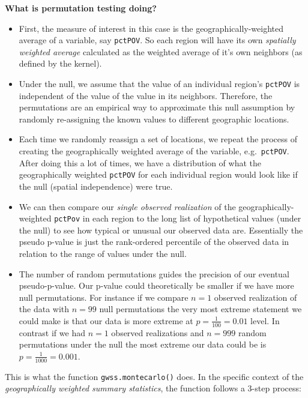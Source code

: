 \documentclass[
]{book}
\providecommand{\tightlist}{%
  \setlength{\itemsep}{0pt}\setlength{\parskip}{0pt}}
\newenvironment{rmdnote}[1]
  {
  \begin{itemize}
  \renewcommand{\labelitemi}{
    \raisebox{-.7\height}[0pt][0pt]{
      {\setkeys{Gin}{width=3em,keepaspectratio}\texttt{[image: images/\#1]}}
    }
  }
  \setlength{\fboxsep}{1em}
  \begin{note}
  \item
  }
  {
  \end{note}
  \end{itemize}
  }
\begin{document}
\begin{rmdnote}{note}

\textbf{What is permutation testing doing?}

\begin{itemize}
\tightlist
\item
  First, the measure of interest in this case is the geographically-weighted average of a variable, say \texttt{pctPOV}. So each region will have its own \emph{spatially weighted average} calculated as the weighted average of it's own neighbors (as defined by the kernel).
\item
  Under the null, we assume that the value of an individual region's \texttt{pctPOV} is independent of the value of the value in its neighbors. Therefore, the permutations are an empirical way to approximate this null assumption by randomly re-assigning the known values to different geographic locations.
\item
  Each time we randomly reassign a set of locations, we repeat the process of creating the geographically weighted average of the variable, e.g.~\texttt{pctPOV}. After doing this a lot of times, we have a distribution of what the geographically weighted \texttt{pctPOV} for each individual region would look like if the null (spatial independence) were true.
\item
  We can then compare our \emph{single observed realization} of the geographically-weighted \texttt{pctPov} in each region to the long list of hypothetical values (under the null) to see how typical or unusual our observed data are. Essentially the pseudo p-value is just the rank-ordered percentile of the observed data in relation to the range of values under the null.
\item
  The number of random permutations guides the precision of our eventual pseudo-p-value. Our p-value could theoretically be smaller if we have more null permutations. For instance if we compare \(n=1\) observed realization of the data with \(n=99\) null permutations the very most extreme statement we could make is that our data is more extreme at \(p = \frac{1}{100} = 0.01\) level. In contrast if we had \(n=1\) observed realizations and \(n=999\) random permutations under the null the most extreme our data could be is \(p = \frac{1}{1000} = 0.001\).
\end{itemize}

\end{rmdnote}

This is what the function \texttt{gwss.montecarlo()} does. In the specific context of the \emph{geographically weighted summary statistics}, the function follows a 3-step process:
\end{document}
